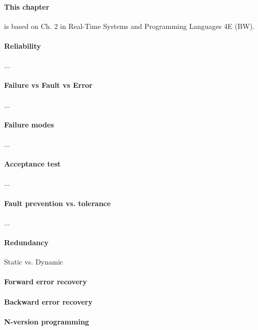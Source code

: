 
\paragraph{This chapter} is based on Ch. 2 in Real-Time Systems and Programming Languages 4E (BW).

\sepline

\paragraph{Reliability} ...

\paragraph{Failure vs Fault vs Error} ...

\paragraph{Failure modes} ...

\paragraph{Acceptance test} ...

\paragraph{Fault prevention vs. tolerance} ...

\paragraph{Redundancy} Static vs. Dynamic

\paragraph{Forward error recovery}

\paragraph{Backward error recovery}

\paragraph{N-version programming}

